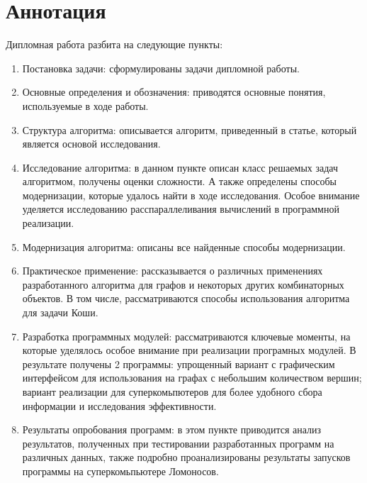 \section*{Аннотация}
\label{sec:Annotation} 
\large

Дипломная работа разбита на следующие пункты:
\begin{enumerate}
\item Постановка задачи: сформулированы задачи дипломной работы.
\item Основные определения и обозначения: приводятся основные понятия, используемые в ходе работы.
\item Структура алгоритма: описывается алгоритм, приведенный в статье, который является основой исследования.
\item Исследование алгоритма: в данном пункте описан класс решаемых задач алгоритмом, получены оценки сложности. А также определены способы модернизации, которые удалось найти в ходе исследования. Особое внимание уделяется исследованию расспараллеливания вычислений в программной реализации.
\item Модернизация алгоритма: описаны все найденные способы модернизации.
\item Практическое применение: рассказывается о различных применениях разработанного алгоритма для графов и некоторых других комбинаторных объектов. В том числе, рассматриваются способы использования алгоритма для задачи Коши.
\item Разработка программных модулей: рассматриваются ключевые моменты, на которые уделялось особое внимание при реализации програмных модулей. В результате получены 2 программы: упрощенный вариант с графическим интерфейсом для использования на графах с небольшим количеством вершин; вариант реализации для суперкомьпютеров для более удобного сбора информации и исследования эффективности.
\item Результаты опробования программ: в этом пункте приводится анализ результатов, полученных при тестировании разработанных программ на различных данных, также подробно проанализированы результаты запусков программы на суперкомьпьютере Ломоносов.
\end{enumerate}
